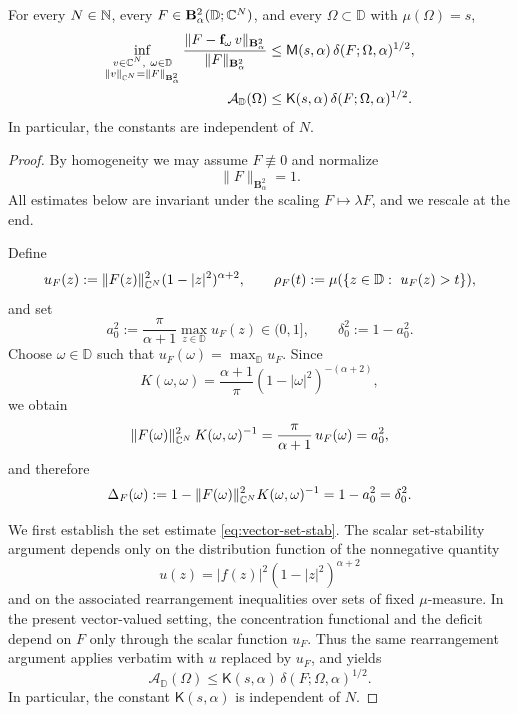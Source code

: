 \documentclass[a4paper,10pt]{amsart}
\newcommand{\D}{\mathbb{D}}
\newcommand{\Berg}{\mathbf{B}_{\alpha}^2}
\begin{document}
\begin{numthm}\label{lem:vector-stability-same-constants}
For every $N\in\mathbb{N}$, every $F\in \mathbf B_\alpha^2(\D;\C^N)$, and every $\Omega\subset\D$ with $\mu(\Omega)=s$,
\begin{align}
\inf_{\substack{v\in\C^N,\ \omega\in\D\\ \|v\|_{\C^N}=\|F\|_{\Berg}}}
\frac{\|F-\mathbf f_\omega\,v\|_{\Berg}}{\|F\|_{\Berg}}
&\le \mathsf M(s,\alpha)\,\delta(F;\Omega,\alpha)^{1/2},\label{eq:vector-fun-stab}\\
\mathcal A_{\D}(\Omega)
&\le \mathsf K(s,\alpha)\,\delta(F;\Omega,\alpha)^{1/2}.
\label{eq:vector-set-stab}
\end{align}
In particular, the constants are independent of $N$.
\end{numthm}
\begin{proof}
By homogeneity we may assume $F\not\equiv 0$ and normalize
\[
\|F\|_{\Berg}=1.
\]
All estimates below are invariant under the scaling $F\mapsto \lambda F$, and we rescale at the end.

Define
\[
u_F(z):=\|F(z)\|_{\C^N}^2(1-|z|^2)^{\alpha+2},\qquad
\rho_F(t):=\mu(\{z\in\D:\ u_F(z)>t\}),
\]
and set
\[
a_0^2:=\frac{\pi}{\alpha+1}\max_{z\in\D}u_F(z)\in(0,1],\qquad
\delta_0^2:=1-a_0^2.
\]
Choose $\omega\in\D$ such that $u_F(\omega)=\max_\D u_F$. Since
\[
K(\omega,\omega)=\frac{\alpha+1}{\pi}(1-|\omega|^2)^{-(\alpha+2)},
\]
we obtain
\begin{equation}\label{eq:Delta_equals_delta0_vector}
\|F(\omega)\|_{\mathbb{C}^N}^2\,K(\omega,\omega)^{-1}
=\frac{\pi}{\alpha+1}\,u_F(\omega)=a_0^2,
\end{equation}
and therefore
\begin{equation}\label{eq:RKHSdef_at_omega}
\Delta_F(\omega)
:=1-\|F(\omega)\|_{\mathbb{C}^N}^2K(\omega,\omega)^{-1}
=1-a_0^2
=\delta_0^2.
\end{equation}

We first establish the set estimate \eqref{eq:vector-set-stab}. The scalar set-stability argument depends only on the distribution function of the nonnegative quantity
\[
u(z)=|f(z)|^2(1-|z|^2)^{\alpha+2}
\]
and on the associated rearrangement inequalities over sets of fixed $\mu$-measure. In the present vector-valued setting, the concentration functional and the deficit depend on $F$ only through the scalar function $u_F$. Thus the same rearrangement argument applies verbatim with $u$ replaced by $u_F$, and yields
\[
\mathcal A_{\D}(\Omega)\le \mathsf K(s,\alpha)\,\delta(F;\Omega,\alpha)^{1/2}.
\]
In particular, the constant $\mathsf K(s,\alpha)$ is independent of $N$.


\end{proof}
\end{document}
